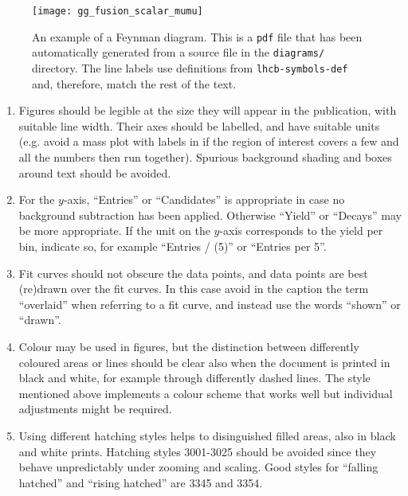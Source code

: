 \begin{figure}
  \begin{center}
    \texttt{[image: gg\_fusion\_scalar\_mumu]}
  \end{center}
  \caption{An example of a Feynman diagram. This is a \texttt{pdf} file that has been automatically generated from a
           source file in the \texttt{diagrams/} directory. The line labels use definitions from
           \texttt{lhcb-symbols-def} and, therefore, match the rest of the text.}
\end{figure}

\begin{enumerate}

\item Figures should be legible at the size they will appear in the
  publication, with suitable line width.  Their axes should be
  labelled, and have suitable units (e.g. avoid a mass plot with
  labels in \si{\MeVcc} if the region of interest covers a few \si{\GeVcc}
  and all the numbers then run together).  Spurious background shading
  and boxes around text should be avoided.

\item For the $y$-axis, ``Entries'' or ``Candidates'' is appropriate in case no
background subtraction has been applied. Otherwise ``Yield'' or ``Decays''
may be more appropriate. If the unit on the $y$-axis corresponds to 
the yield per bin, indicate so, for example ``Entries / (\SI{5}{\MeVcc})'' or ``Entries per \SI{5}{\MeVcc}''.


\item Fit curves should not obscure the data points, and
   data points are best (re)drawn over the fit curves. In this
   case avoid in the caption the term ``overlaid'' when
   referring to a fit curve, and instead use the words  
   ``shown'' or ``drawn''.

\item Colour may be used in figures, but the distinction between
  differently coloured areas or lines should be clear also when the
  document is printed in black and white, for example through
  differently dashed lines. The \lhcb style mentioned above implements
  a colour scheme that works well but individual adjustments might be
  required.

\item Using different hatching styles helps to disinguished filled areas, 
also in black and white prints. Hatching styles 3001-3025 should be
avoided since they behave unpredictably under zooming and scaling. 
Good styles for ``falling hatched'' and ``rising hatched'' are 3345 and 3354.



\end{enumerate}
